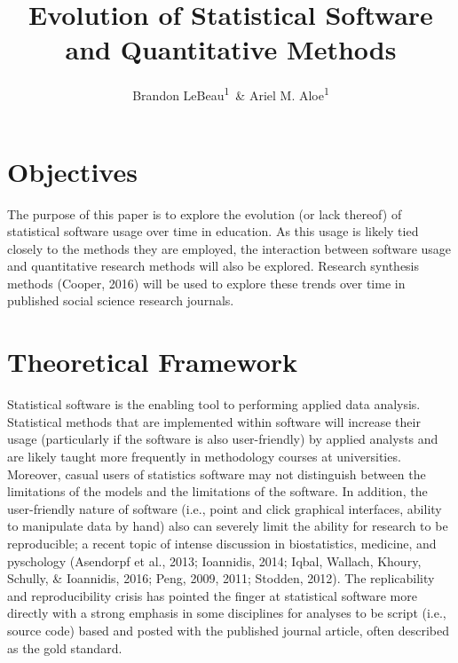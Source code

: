 \documentclass[english,,man]{apa6}
\title{Evolution of Statistical Software and Quantitative Methods}
\author{Brandon LeBeau\textsuperscript{1}~\& Ariel M. Aloe\textsuperscript{1}}
\date{}
\affiliation{
\vspace{0.5cm}
\textsuperscript{1} University of Iowa}
\theoremstyle{definition}
\theoremstyle{definition}
\theoremstyle{definition}
\theoremstyle{remark}
\begin{document}
\maketitle

\hypertarget{objectives}{%
\section{Objectives}\label{objectives}}

The purpose of this paper is to explore the evolution (or lack thereof)
of statistical software usage over time in education. As this usage is
likely tied closely to the methods they are employed, the interaction
between software usage and quantitative research methods will also be
explored. Research synthesis methods (Cooper, 2016) will be used to
explore these trends over time in published social science research
journals.

\hypertarget{theoretical-framework}{%
\section{Theoretical Framework}\label{theoretical-framework}}

Statistical software is the enabling tool to performing applied data
analysis. Statistical methods that are implemented within software will
increase their usage (particularly if the software is also
user-friendly) by applied analysts and are likely taught more frequently
in methodology courses at universities. Moreover, casual users of
statistics software may not distinguish between the limitations of the
models and the limitations of the software. In addition, the
user-friendly nature of software (i.e., point and click graphical
interfaces, ability to manipulate data by hand) also can severely limit
the ability for research to be reproducible; a recent topic of intense
discussion in biostatistics, medicine, and pyschology (Asendorpf et al.,
2013; Ioannidis, 2014; Iqbal, Wallach, Khoury, Schully, \& Ioannidis,
2016; Peng, 2009, 2011; Stodden, 2012). The replicability and
reproducibility crisis has pointed the finger at statistical software
more directly with a strong emphasis in some disciplines for analyses to
be script (i.e., source code) based and posted with the published
journal article, often described as the gold standard.
\end{document}
